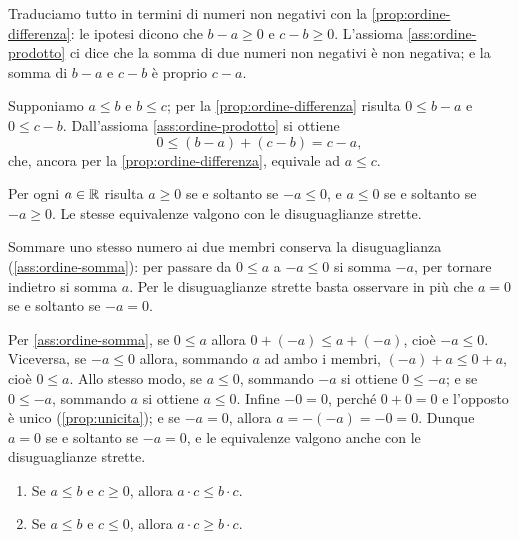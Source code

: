 \begin{strategia}
Traduciamo tutto in termini di numeri non negativi con la
\cref{prop:ordine-differenza}: le ipotesi dicono che $b-a\ge0$ e $c-b\ge0$. L'assioma
\ref{ass:ordine-prodotto} ci dice che la somma di due numeri non negativi è non
negativa; e la somma di $b-a$ e $c-b$ è proprio $c-a$.
\end{strategia}

\begin{dimostrazione}
Supponiamo $a\le b$ e $b\le c$; per la \cref{prop:ordine-differenza} risulta
$0\le b-a$ e $0\le c-b$. Dall'assioma \ref{ass:ordine-prodotto} si ottiene
\[
  0 \le (b-a)+(c-b) = c-a,
\]
che, ancora per la \cref{prop:ordine-differenza}, equivale ad $a\le c$.
\end{dimostrazione}

\begin{proposizione}\label{prop:segno-opposto}
Per ogni $a\in\mathbb{R}$ risulta $a\ge0$ se e soltanto se $-a\le0$, e $a\le0$ se e soltanto
se $-a\ge0$. Le stesse equivalenze valgono con le disuguaglianze strette.
\end{proposizione}

\begin{schema}
\end{schema}

\begin{strategia}
Sommare uno stesso numero ai due membri conserva la disuguaglianza
(\ref{ass:ordine-somma}): per passare da $0\le a$ a $-a\le0$ si somma $-a$, per tornare
indietro si somma $a$. Per le disuguaglianze strette basta osservare in più che $a=0$ se
e soltanto se $-a=0$.
\end{strategia}

\begin{dimostrazione}
Per \ref{ass:ordine-somma}, se $0\le a$ allora $0+(-a)\le a+(-a)$, cioè $-a\le0$.
Viceversa, se $-a\le0$ allora, sommando $a$ ad ambo i membri, $(-a)+a\le0+a$, cioè
$0\le a$. Allo stesso modo, se $a\le0$, sommando $-a$ si ottiene $0\le-a$; e se
$0\le-a$, sommando $a$ si ottiene $a\le0$. Infine $-0=0$, perché $0+0=0$ e l'opposto è
unico (\cref{prop:unicita}); e se $-a=0$, allora $a=-(-a)=-0=0$. Dunque $a=0$ se e
soltanto se $-a=0$, e le equivalenze valgono anche con le disuguaglianze strette.
\end{dimostrazione}

\begin{proposizione}\label{prop:ordine-prodotto}
\leavevmode
\begin{enumerate}
  \item Se $a\le b$ e $c\ge0$, allora $a\cdot c\le b\cdot c$.
  \item Se $a\le b$ e $c\le0$, allora $a\cdot c\ge b\cdot c$.
\end{enumerate}
\end{proposizione}

